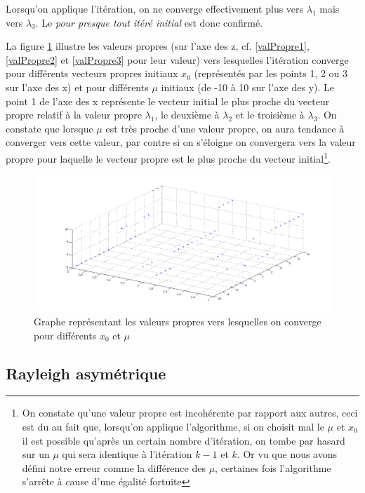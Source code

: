 Lorsqu'on applique l'itération, on ne converge effectivement plus vers $\lambda_1$ mais vers $\lambda_3$. Le \textit{pour presque tout itéré initial} est donc confirmé.


La figure \ref{fig:RaySym} illustre les valeurs propres (sur l'axe des z, cf. \ref{valPropre1}, \ref{valPropre2} et \ref{valPropre3} pour leur valeur) vers lesquelles l'itération converge pour différents vecteurs propres initiaux $x_0$ (représentés par les points 1, 2 ou 3 sur l'axe des x) et pour différents $\mu$ initiaux (de -10 à 10 sur l'axe des y). Le point 1 de l'axe des x représente le vecteur initial le plus proche du vecteur propre relatif à la valeur propre $\lambda_1$, le deuxième à $\lambda_2$ et le troisième à $\lambda_3$. On constate que lorsque $\mu$ est très proche d'une valeur propre, on aura tendance à converger vers cette valeur, par contre si on s'éloigne on convergera vers la valeur propre pour laquelle le vecteur propre est le plus proche du vecteur initial\footnote{On constate qu'une valeur propre est incohérente par rapport aux autres, ceci est du au fait que, lorsqu'on applique l'algorithme, si on choisit mal le $\mu$ et $x_0$ il est possible qu'après un certain nombre d'itération, on tombe par hasard sur un $\mu$ qui sera identique à l'itération $k-1$ et $k$. Or vu que nous avons défini notre erreur comme la différence des $\mu$, certaines fois l'algorithme s'arrête à cause d'une égalité fortuite  }. 

\begin{figure}
  \centering
  \includegraphics[width=15cm]{RaySym.png}
  \caption{Graphe représentant les valeurs propres vers lesquelles on converge pour différents $x_0$ et $\mu$}
  \label{fig:RaySym}
\end{figure}

\subsection*{Rayleigh asymétrique}

